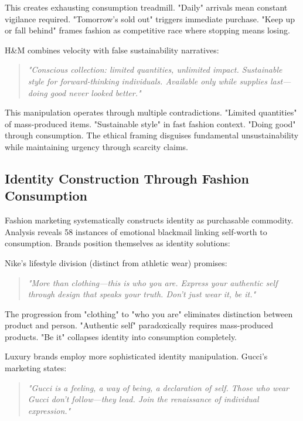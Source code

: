 This creates exhausting consumption treadmill. "Daily" arrivals mean constant vigilance required. "Tomorrow's sold out" triggers immediate purchase. "Keep up or fall behind" frames fashion as competitive race where stopping means losing.

H&M combines velocity with false sustainability narratives:

\begin{quote}
\textit{"Conscious collection: limited quantities, unlimited impact. Sustainable style for forward-thinking individuals. Available only while supplies last—doing good never looked better."}
\end{quote}

This manipulation operates through multiple contradictions. "Limited quantities" of mass-produced items. "Sustainable style" in fast fashion context. "Doing good" through consumption. The ethical framing disguises fundamental unsustainability while maintaining urgency through scarcity claims.

\subsection{Identity Construction Through Fashion Consumption}

Fashion marketing systematically constructs identity as purchasable commodity. Analysis reveals 58 instances of emotional blackmail linking self-worth to consumption. Brands position themselves as identity solutions:

Nike's lifestyle division (distinct from athletic wear) promises:

\begin{quote}
\textit{"More than clothing—this is who you are. Express your authentic self through design that speaks your truth. Don't just wear it, be it."}
\end{quote}

The progression from "clothing" to "who you are" eliminates distinction between product and person. "Authentic self" paradoxically requires mass-produced products. "Be it" collapses identity into consumption completely.

Luxury brands employ more sophisticated identity manipulation. Gucci's marketing states:

\begin{quote}
\textit{"Gucci is a feeling, a way of being, a declaration of self. Those who wear Gucci don't follow—they lead. Join the renaissance of individual expression."}
\end{quote}

